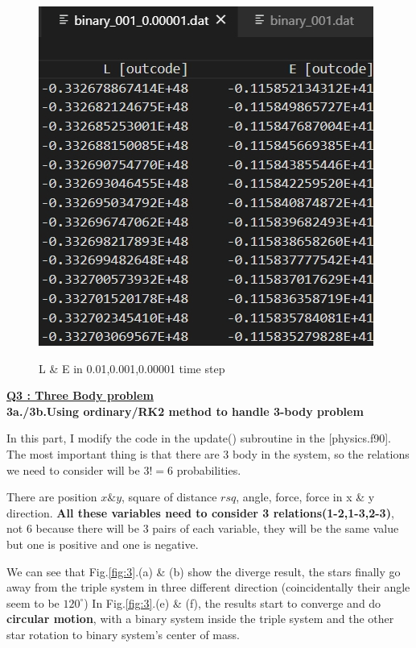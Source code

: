 \documentclass{article}
\begin{document}
\begin{figure}[h]
{        \includegraphics[scale=0.33]{00001.jpg}
        \label{00001} 
    }
    \caption{L \& E in 0.01,0.001,0.00001 time step}
    \label{fig:2c_dat}
\end{figure}

\underline{\textbf{Q3 : Three Body problem}}\\
\textbf{3a./3b.Using ordinary/RK2 method to handle 3-body problem}

In this part, I modify the code in the update() subroutine in the [physics.f90]. The most important thing is that there are 3 body in the system, so the relations we need to consider will be $3!=6$ probabilities.

There are position $x \& y$, square of distance $rsq$, angle, force, force in x \& y direction. \textbf{All these variables need to consider 3 relations(1-2,1-3,2-3)}, not 6 because there will be 3 pairs of each variable, they will be the same value but one is positive and one is negative.

We can see that Fig.\ref{fig:3}.(a) \& (b) show the diverge result, the stars finally go away from the triple system in three different direction (coincidentally their angle seem to be $120^\circ$)
In Fig.\ref{fig:3}.(e) \& (f), the results start to converge and do \textbf{circular motion}, with a binary system inside the triple system and the other star rotation to binary system's center of mass.
\end{document}
